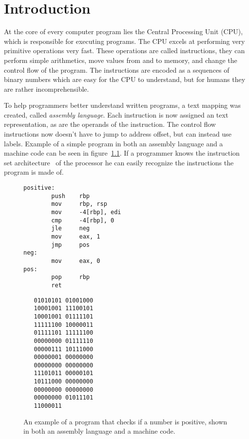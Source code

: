 \chapter{Introduction}
At the core of every computer program lies the Central Processing Unit (CPU),
which is responsible for executing programs. The CPU excels at performing very
primitive operations very fast. These operations are called instructions, they
can perform simple arithmetics, move values from and to memory, and change the
control flow of the program. The instructions are encoded as a sequences of
binary numbers which are easy for the CPU to understand, but for humans they
are rather incomprehensible.

To help programmers better understand written programs, a text mapping was
created, called \textit{assembly language}. Each instruction is now assigned an
text representation, as are the operands of the instruction. The control flow
instructions now doesn't have to jump to address offset, but can instead use
labels. Example of a simple program in both an assembly language and a machine
code can be seen in figure~\ref{fig:simple-assembly}. If a programmer knows the
instruction set architecture~\cite{isa} of the processor he can easily
recognize the instructions the program is made of.

\begin{figure}
    \begin{minipage}{.45\textwidth}
    \begin{lstlisting}
positive:
        push    rbp
        mov     rbp, rsp
        mov     -4[rbp], edi
        cmp     -4[rbp], 0
        jle     neg
        mov     eax, 1
        jmp     pos
neg:
        mov     eax, 0
pos:
        pop     rbp
        ret
    \end{lstlisting}
    \end{minipage}
    \hfill\vline\hfill
    \begin{minipage}{.45\textwidth}
    \begin{lstlisting}
   01010101 01001000
   10001001 11100101
   10001001 01111101
   11111100 10000011
   01111101 11111100
   00000000 01111110
   00000111 10111000
   00000001 00000000
   00000000 00000000
   11101011 00000101
   10111000 00000000
   00000000 00000000
   00000000 01011101
   11000011
    \end{lstlisting}
    \end{minipage}
    \caption{An example of a program that checks if a number is positive, shown
    in both an assembly language and a machine code.}
    \label{fig:simple-assembly}
\end{figure}

